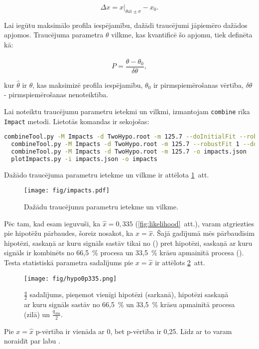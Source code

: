 \begin{equation}
  \Delta x = x\bigg\rvert_{\theta \text{at} \pm\sigma}-x_{0}.
\end{equation} 

Lai iegūtu maksimālo profila iespējamību, dažādi traucējumi jāpiemēro dažādos apjomos. Traucējuma parametra $\theta$ vilkme, kas kvantificē šo apjomu, tiek definēta kā:

\begin{equation}
  P = \frac{\hat{\theta}-\theta_{0}}{\delta\theta},
\end{equation} 

kur $\hat{\theta}$ ir $\theta$, kas maksimizē profila iespējamību, $\theta_{0}$ ir pirmspiemērošanas vērtība, $\delta\theta$ - pirmspiemērošanas nenoteiktība.

Lai noteiktu traucējumu parametru ietekmi un vilkmi, izmantojam \lstinline[language=sh]|combine| rīka \lstinline[language=sh]|Impact| metodi. Lietotās komandas ir sekojošas:

\begin{lstlisting}[language=sh, breaklines=true]
  combineTool.py -M Impacts -d TwoHypo.root -m 125.7 --doInitialFit --robustFit 1
  combineTool.py -M Impacts -d TwoHypo.root -m 125.7 --robustFit 1 --doFits
  combineTool.py -M Impacts -d TwoHypo.root -m 125.7 -o impacts.json
  plotImpacts.py -i impacts.json -o impacts
\end{lstlisting}

Dažādo traucējuma parametru ietekme un vilkme ir attēlota \ref{fig:impacts}~att.

\begin{figure}
  \centering
  \texttt{[image: fig/impacts.pdf]}
  \caption{Dažādu traucējumu parametru ietekme un vilkme.}
  \label{fig:impacts}
\end{figure}

Pēc tam, kad esam ieguvuši, ka $\hat{x}=0,335$ (\ref{fig:likelihood}~att.), varam atgriezties pie hipotēžu pārbaudes, šoreiz nosakot, ka $x=\hat{x}$. Šajā gadījumā mēs pārbaudīsim hipotēzi, saskaņā ar kuru signāls sastāv tikai no \ttbar (\Hnull) pret hipotēzi, saskaņā ar kuru signāls ir kombinēts no 66,5~\% \ttbar procesa un 33,5~\% krāsu apmainītā \ttbar procesa (\Halt). Testa statistiskā parametra sadalījums pie $x=\hat{x}$ ir attēlots \ref{fig:hypo0p335}~att.

\begin{figure}
  \centering
  \texttt{[image: fig/hypo0p335.png]}
  \caption{$\frac{q}{2}$ sadalījums, pieņemot vienīgi \ttbar hipotēzi (sarkanā), hipotēzi saskaņā ar kuru signāls sastāv no 66,5~\% \ttbar un 33,5~\% krāsu apmainītā \ttbar procesa (zilā) un $\frac{q_{\text{obs}}}{2}$.}
  \label{fig:hypo0p335}
\end{figure}

Pie $x=\hat{x}$ \Hnull p-vērtība ir vienāda ar 0, bet \Halt p-vērtība ir 0,25. Līdz ar to varam noraidīt \Hnull par labu \Halt.
